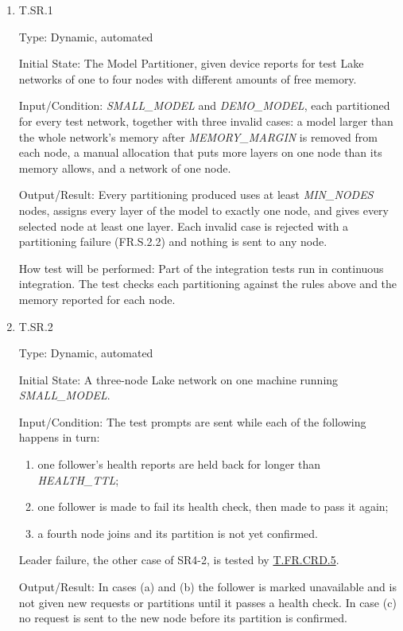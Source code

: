 \documentclass[12pt, titlepage]{article}
\begin{document}
\begin{enumerate}

\item{T.SR.1\\}
\label{T.SR.1}

Type: Dynamic, automated

Initial State: The Model Partitioner, given device reports for test Lake
networks of one to four nodes with different amounts of free memory.

Input/Condition: \textit{SMALL\_MODEL} and \textit{DEMO\_MODEL}, each
partitioned for every test network, together with three invalid cases: a model
larger than the whole network's memory after \textit{MEMORY\_MARGIN} is
removed from each node, a manual allocation that puts more layers on one node
than its memory allows, and a network of one node.

Output/Result: Every partitioning produced uses at least \textit{MIN\_NODES}
nodes, assigns every layer of the model to exactly one node, and gives every
selected node at least one layer. Each invalid case is rejected with a
partitioning failure (FR.S.2.2) and nothing is sent to any node.

How test will be performed: Part of the integration tests run in continuous
integration. The test checks each partitioning against the rules above and the
memory reported for each node.

\item{T.SR.2\\}
\label{T.SR.2}

Type: Dynamic, automated

Initial State: A three-node Lake network on one machine running
\textit{SMALL\_MODEL}.

Input/Condition: The test prompts are sent while each of the following happens
in turn:
\begin{enumerate}
  \item one follower's health reports are held back for longer than
    \textit{HEALTH\_TTL};
  \item one follower is made to fail its health check, then made to pass it
    again;
  \item a fourth node joins and its partition is not yet confirmed.
\end{enumerate}
Leader failure, the other case of SR4-2, is tested by
\hyperref[T.FR.CRD.5]{T.FR.CRD.5}.

Output/Result: In cases (a) and (b) the follower is marked unavailable and is not
given new requests or partitions until it passes a health check. In case (c) no
request is sent to the new node before its partition is confirmed.


\end{enumerate}
\end{document}
